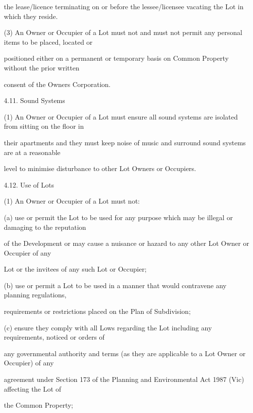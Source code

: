 \documentclass{article}
\begin{document}
{\fontsize{10.02}{1}the lease/licence terminating on or before the lessee/licensee vacating the Lot in which they reside. }

{\fontsize{9.962}{1}(3) An Owner or Occupier of a Lot must not and must not permit any personal items to be placed, located or }

{\fontsize{10.02}{1}positioned either on a permanent or temporary basis on Common Property without the prior written }

{\fontsize{10.02}{1}consent of the Owners Corporation. }

{\fontsize{9.99}{1}4.11. Sound Systems }

{\fontsize{9.962}{1}(1) An Owner or Occupier of a Lot must ensure all sound systems are isolated from sitting on the floor in }

{\fontsize{10.02}{1}their apartments and they must keep noise of music and surround sound systems are at a reasonable }

{\fontsize{10.02}{1}level to minimise disturbance to other Lot Owners or Occupiers. }

{\fontsize{9.99}{1}4.12. Use of Lots }

{\fontsize{9.962}{1}(1) An Owner or Occupier of a Lot must not: }

{\fontsize{9.962}{1}(a) use or permit the Lot to be used for any purpose which may be illegal or damaging to the reputation }

{\fontsize{10.02}{1}of the Development or may cause a nuisance or hazard to any other Lot Owner or Occupier of any }

{\fontsize{10.02}{1}Lot or the invitees of any such Lot or Occupier; }

{\fontsize{9.962}{1}(b) use or permit a Lot to be used in a manner that would contravene any planning regulations, }

{\fontsize{10.02}{1}requirements or restrictions placed on the Plan of Subdivision; }

{\fontsize{9.962}{1}(c) ensure they comply with all Lows regarding the Lot including any requirements, noticed or orders of }

{\fontsize{10.02}{1}any governmental authority and terms (as they are applicable to a Lot Owner or Occupier) of any }

{\fontsize{10.02}{1}agreement under Section 173 of the Planning and Environmental Act 1987 (Vic) affecting the Lot of }

{\fontsize{10.02}{1}the Common Property; }
\end{document}
